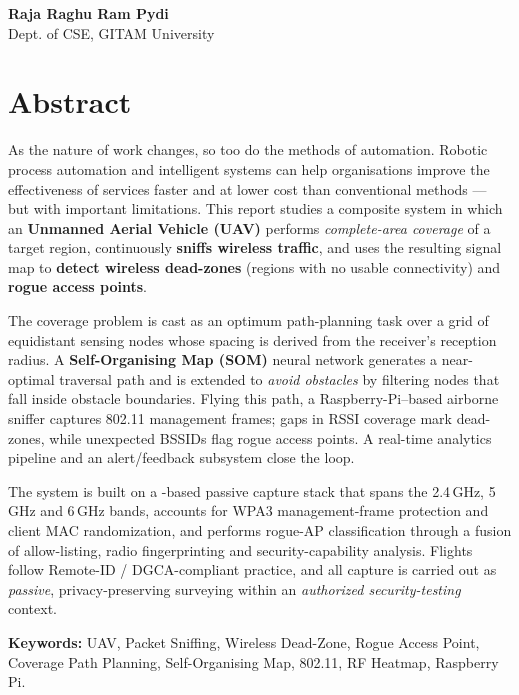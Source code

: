 \vspace{0.8cm}
\noindent\hfill\begin{minipage}{0.45\textwidth}\raggedleft
\textbf{Raja Raghu Ram Pydi}\\
Dept. of CSE, GITAM University
\end{minipage}

\chapter*{Abstract}
\thispagestyle{plain}

\noindent As the nature of work changes, so too do the methods of automation.
Robotic process automation and intelligent systems can help organisations
improve the effectiveness of services faster and at lower cost than conventional
methods --- but with important limitations. This report studies a composite
system in which an \textbf{Unmanned Aerial Vehicle (UAV)} performs
\emph{complete-area coverage} of a target region, continuously \textbf{sniffs
wireless traffic}, and uses the resulting signal map to \textbf{detect wireless
dead-zones} (regions with no usable connectivity) and \textbf{rogue access
points}.

\vspace{6pt}
\noindent The coverage problem is cast as an optimum path-planning task over a
grid of equidistant sensing nodes whose spacing is derived from the receiver's
reception radius. A \textbf{Self-Organising Map (SOM)} neural network generates a
near-optimal traversal path and is extended to \emph{avoid obstacles} by
filtering nodes that fall inside obstacle boundaries. Flying this path, a
Raspberry-Pi--based airborne sniffer captures 802.11 management frames; gaps in
RSSI coverage mark dead-zones, while unexpected BSSIDs flag rogue access points.
A real-time analytics pipeline and an alert/feedback subsystem close the loop.

\vspace{6pt}
\noindent The system is built on a -based passive capture stack that
spans the 2.4\,GHz, 5\,GHz and 6\,GHz bands, accounts for WPA3 management-frame
protection and client MAC randomization, and performs rogue-AP classification
through a fusion of allow-listing, radio fingerprinting and
security-capability analysis. Flights follow Remote-ID / DGCA-compliant practice,
and all capture is carried out as \emph{passive}, privacy-preserving surveying
within an \emph{authorized security-testing} context.

\vspace{10pt}
\noindent\textbf{Keywords:} UAV, Packet Sniffing, Wireless Dead-Zone, Rogue
Access Point, Coverage Path Planning, Self-Organising Map, 802.11, RF Heatmap,
Raspberry Pi.

\cleardoublepage
{}
{\color{navy}\hypersetup{linkcolor=navy}
\tableofcontents}
\cleardoublepage
{\hypersetup{linkcolor=navy}\listoffigures}
\cleardoublepage
{\hypersetup{linkcolor=navy}\listoftables}
\cleardoublepage
